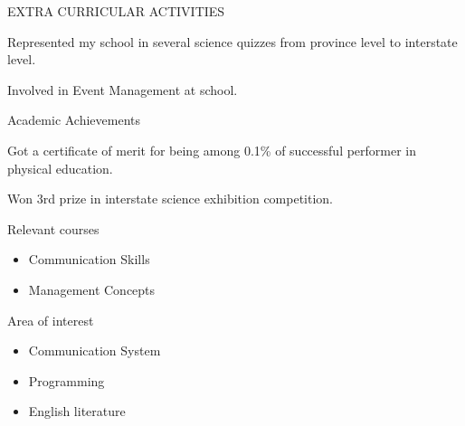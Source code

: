 \documentclass{resume} %
\newcommand{\tab}[1]{\hspace{.2667\textwidth}\rlap{#1}}
\newcommand{\itab}[1]{\hspace{0em}\rlap{#1}}
\begin{document}
\begin{rSection}{EXTRA CURRICULAR ACTIVITIES}
\item	Represented my school in several science quizzes from province level to interstate level.
\item	Involved in Event Management at school.\\


\end{rSection}





\begin{rSection}{Academic Achievements} \itemsep -2pt
\item Got a certificate of merit for being among 0.1\% of successful performer in physical education.
\item Won 3rd prize in interstate science exhibition competition.\\
\end{rSection}

\begin{rSection}{Relevant courses}

\begin{itemize}
\item Communication Skills
\item Management Concepts \\
\end{itemize}


\end{rSection}

\begin{rSection}{Area of interest}
\begin{itemize}
\item  Communication System
\item	Programming 
\item	English literature \\

\end{itemize}





\end{rSection}
\end{document}
